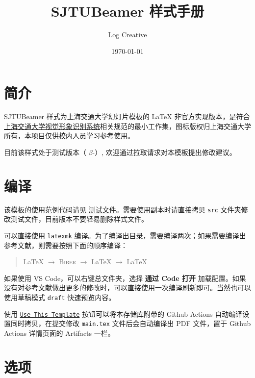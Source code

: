\documentclass[a4paper,12pt]{article}
\begin{document}
\begin{CJK}{UTF8}{song}
\title{\textsf{SJTUBeamer}  样式手册}
\author{Log Creative}
\date{\today}
\maketitle

\tableofcontents    %

\clearpage

\section{简介}

\textsf{SJTUBeamer}  样式为上海交通大学幻灯片模板的 \LaTeX{} 非官方实现版本，是符合\href{http://vi.sjtu.edu.cn/}{上海交通大学视觉形象识别系统}相关规范的最小工作集，图标版权归上海交通大学所有，本项目仅供校内人员学习参考使用。

目前该样式处于测试版本（ $\beta$-）, 欢迎通过拉取请求对本模板提出修改建议。

\section{编译}

该模板的使用范例代码请见 \href{https://github.com/LogCreative/SJTUBeamer/blob/main/src/main.tex}{测试文件}。需要使用副本时请直接拷贝 \verb"src" 文件夹修改测试文件，目前版本不要轻易删除样式文件。

可以直接使用 \verb"latexmk" 编译。为了编译出目录，需要编译两次；如果需要编译出参考文献，则需要按照下面的顺序编译：
\begin{quotation}
    \LaTeX{} $\rightarrow$ \textsc{Biber} $\rightarrow$ \LaTeX{} $\rightarrow$ \LaTeX{}
\end{quotation}
如果使用 VS Code，可以右键总文件夹，选择 \textbf{通过 Code 打开} 加载配置。如果没有对参考文献做出更多的修改时，可以直接使用一次编译刷新即可。当然也可以使用草稿模式 \verb"draft" 快速预览内容。

使用 \href{https://github.com/LogCreative/SJTUBeamer/generate}{\texttt{Use This Template}} 按钮可以将本存储库附带的 Github Actions 自动编译设置同时拷贝，在提交修改 \verb"main.tex" 文件后会自动编译出 PDF 文件，置于 Github Actions 详情页面的 Artifacts 一栏。

\section{选项}


\end{CJK}
\end{document}
